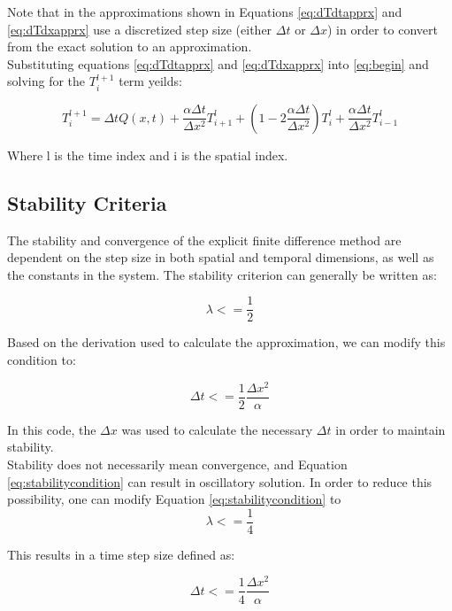 \documentclass[12pt]{amsart}
\begin{document}
Note that in the approximations shown in Equations \ref{eq:dTdtapprx} and \ref{eq:dTdxapprx} use a discretized step size (either $\Delta t$ or $\Delta x$) in order to convert from the exact solution to an approximation. \\
Substituting equations \ref{eq:dTdtapprx} and \ref{eq:dTdxapprx} into \ref{eq:begin} and solving for the $T^{l+1}_i$ term yeilds:

\begin{equation}
T^{l+1}_i = \Delta t Q(x,t) + \frac{\alpha \Delta t}{\Delta x^2} T^l_{i+1}+ (1-2\frac{\alpha \Delta t}{\Delta x^2}) T^l_i + \frac{\alpha \Delta t}{\Delta x^2} T^l_{i-1}
\label{eq:finitediff}
\end{equation}

Where l is the time index and i is the spatial index. 
\subsection{Stability Criteria} \label{stabilitycriteria}
The stability and convergence of the explicit finite difference method are dependent on the step size in both spatial and temporal dimensions, as well as the constants in the system. The stability criterion can generally be written as:

\begin{equation}
\lambda <= \frac{1}{2}
\label{eq:stabilitycondition}
\end{equation}

Based on the derivation used to calculate the approximation, we can modify this condition to:

\begin{equation}
\Delta t <= \frac{1}{2} \frac{\Delta x ^2}{\alpha}
\label{eq:stabilitystepsize}
\end{equation}

In this code, the $\Delta x$ was used to calculate the necessary $\Delta t$ in order to maintain stability. \\
Stability does not necessarily mean convergence, and Equation \ref{eq:stabilitycondition} can result in oscillatory solution. In order to reduce this possibility, one can modify Equation \ref{eq:stabilitycondition}  to 
\begin{equation}
\lambda <= \frac{1}{4}
\label{eq:stableconvergentcondition}
\end{equation}

This results in a time step size defined as:

\begin{equation}
\Delta t <= \frac{1}{4} \frac{\Delta x ^2}{\alpha}
\label{eq:stabilityconvergentstepsize}
\end{equation}
\end{document}
